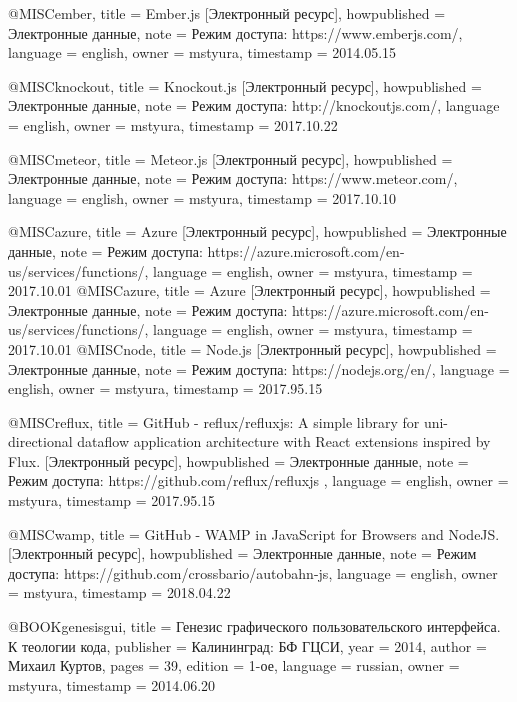    @MISC{ember,
  title = {Ember.js [Электронный ресурс]},
  howpublished = {Электронные данные},
  note = {Режим доступа: https://www.emberjs.com/},
  language = {english},
  owner = {mstyura},
  timestamp = {2014.05.15} 
  }

  @MISC{knockout,
  title = {Knockout.js [Электронный ресурс]},
  howpublished = {Электронные данные},
  note = {Режим доступа: http://knockoutjs.com/},
  language = {english},
  owner = {mstyura},
  timestamp = {2017.10.22} 
  }

  @MISC{meteor,
  title = {Meteor.js [Электронный ресурс]},
  howpublished = {Электронные данные},
  note = {Режим доступа: https://www.meteor.com/},
  language = {english},
  owner = {mstyura},
  timestamp = {2017.10.10} 
  }

   @MISC{azure,
  title = {Azure [Электронный ресурс]},
  howpublished = {Электронные данные},
  note = {Режим доступа: https://azure.microsoft.com/en-us/services/functions/},
  language = {english},
  owner = {mstyura},
  timestamp = {2017.10.01} 
  }
@MISC{azure,
  title = {Azure [Электронный ресурс]},
  howpublished = {Электронные данные},
  note = {Режим доступа: https://azure.microsoft.com/en-us/services/functions/},
  language = {english},
  owner = {mstyura},
  timestamp = {2017.10.01} 
  }
  @MISC{node,
  title = {Node.js [Электронный ресурс]},
  howpublished = {Электронные данные},
  note = {Режим доступа: https://nodejs.org/en/},
  language = {english},
  owner = {mstyura},
  timestamp = {2017.95.15} 
  }

  @MISC{reflux,
  title = {GitHub - reflux/refluxjs: A simple library for uni-directional dataflow
application architecture with React extensions inspired by Flux. [Электронный ресурс]},
  howpublished = {Электронные данные},
  note = {Режим доступа: https://github.com/reflux/refluxjs },
  language = {english},
  owner = {mstyura},
  timestamp = {2017.95.15} 
  }

   @MISC{wamp,
  title = {GitHub - WAMP in JavaScript for Browsers and NodeJS. [Электронный ресурс]},
  howpublished = {Электронные данные},
  note = {Режим доступа: https://github.com/crossbario/autobahn-js},
  language = {english},
  owner = {mstyura},
  timestamp = {2018.04.22} 
  }

@BOOK{genesisgui,
  title = {Генезис графического пользовательского интерфейса. К теологии кода},
  publisher = {Калининград: БФ ГЦСИ},
  year = {2014},
  author = {Михаил Куртов},
  pages = {39},
  edition = {1-ое},
  language = {russian},
  owner = {mstyura},
  timestamp = {2014.06.20}
}

